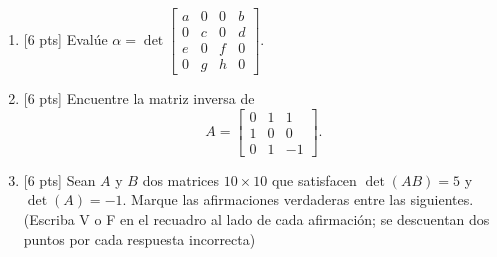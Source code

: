 \documentclass[11pt]{article}
\newcommand{\casillasino}{\fbox{\phantom{XX}}}
\begin{document}
\begin{enumerate}
\vspace{6pt}
\noindent
\begin{minipage}[t]{0.46\linewidth}
$a)\ B=\begin{bmatrix}0&1\\1&0\end{bmatrix}$\hfill\casillasino

\vspace{6pt}
$b)\ B=\begin{bmatrix}1&1\\0&1\end{bmatrix}$\hfill\casillasino
\end{minipage}%
\begin{minipage}[t]{0.5\linewidth}
$c)\ B=\begin{bmatrix}-1&1\\1&-1\end{bmatrix}$\hfill\casillasino

\vspace{6pt}
$d)\ B=\begin{bmatrix}1&-1\\0&-1\end{bmatrix}$\hfill\casillasino
\end{minipage}

\item{}[6 pts] Evalúe $\alpha = \det\begin{bmatrix}a&0&0&b\\0&c&0&d\\e&0&f&0\\0&g&h&0\end{bmatrix}$.

\vspace{4pt}
\fbox{\begin{minipage}[t][2.5cm]{\dimexpr\linewidth-2\fboxsep-2\fboxrule}
$\alpha = $
\end{minipage}}

\item{}[6 pts] Encuentre la matriz inversa de
\[
A=\begin{bmatrix}0&1&1\\1&0&0\\0&1&-1\end{bmatrix}.
\]

\vspace{4pt}

\item{}[6 pts] Sean $A$ y $B$ dos matrices $10\times 10$ que satisfacen $\det(AB)=5$ y $\det(A)=-1$. Marque las afirmaciones verdaderas entre las siguientes. (Escriba V o F en el recuadro al lado de cada afirmación; se descuentan dos puntos por cada respuesta incorrecta)


\end{enumerate}
\end{document}
